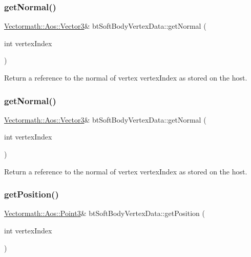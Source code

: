 \subsubsection{\texorpdfstring{get\+Normal()}{getNormal()}\hspace{0.1cm}{\footnotesize\ttfamily [1/2]}}
{\footnotesize\ttfamily \hyperlink{classVectormath_1_1Aos_1_1Vector3}{Vectormath\+::\+Aos\+::\+Vector3}\& bt\+Soft\+Body\+Vertex\+Data\+::get\+Normal (\begin{DoxyParamCaption}\item[{int}]{vertex\+Index }\end{DoxyParamCaption})\hspace{0.3cm}{\ttfamily [inline]}}

Return a reference to the normal of vertex vertex\+Index as stored on the host. \mbox{\label{classbtSoftBodyVertexData_a1404390d4cbbf841e1749dc1779fd104}} 
\subsubsection{\texorpdfstring{get\+Normal()}{getNormal()}\hspace{0.1cm}{\footnotesize\ttfamily [2/2]}}
{\footnotesize\ttfamily \hyperlink{classVectormath_1_1Aos_1_1Vector3}{Vectormath\+::\+Aos\+::\+Vector3}\& bt\+Soft\+Body\+Vertex\+Data\+::get\+Normal (\begin{DoxyParamCaption}\item[{int}]{vertex\+Index }\end{DoxyParamCaption})\hspace{0.3cm}{\ttfamily [inline]}}

Return a reference to the normal of vertex vertex\+Index as stored on the host. \mbox{\label{classbtSoftBodyVertexData_ac5d2dd4b383b386080c45a4fcf45f4f4}} 
\subsubsection{\texorpdfstring{get\+Position()}{getPosition()}\hspace{0.1cm}{\footnotesize\ttfamily [1/2]}}
{\footnotesize\ttfamily \hyperlink{classVectormath_1_1Aos_1_1Point3}{Vectormath\+::\+Aos\+::\+Point3}\& bt\+Soft\+Body\+Vertex\+Data\+::get\+Position (\begin{DoxyParamCaption}\item[{int}]{vertex\+Index }\end{DoxyParamCaption})\hspace{0.3cm}{\ttfamily [inline]}}


